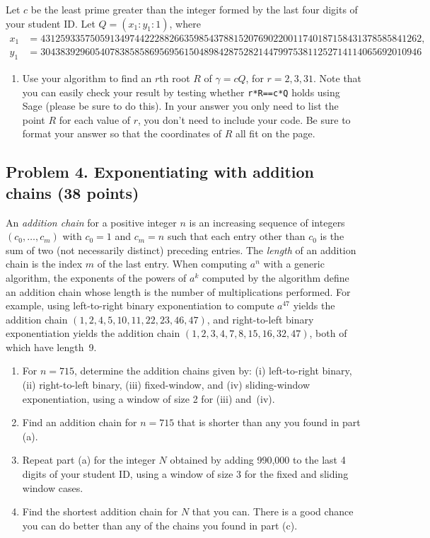 \documentclass[11pt]{article}
\begin{document}
Let $c$ be the least prime greater than the integer formed by the last four digits of your student ID.
Let $Q=(x_1:y_1:1)$, where
\small
\begin{align*}
x_1&=43125933575059134974422288266359854378815207690220011740187158431378585841262,\\
y_1&=30438392960540783858586956956150489842875282144799753811252714114065692010946
\end{align*}
\normalsize
\begin{enumerate}
\item[{\bf (e)}]
Use your algorithm to find an $r$th root $R$ of $\gamma=cQ$, for $r=2,3,31$.
Note that you can easily check your result by testing whether \texttt{r*R==c*Q} holds using Sage (please be sure to do this).
In your answer you only need to list the point $R$ for each value of $r$, you don't need to include your code.
Be sure to format your answer so that the coordinates of $R$ all fit on the page.
\end{enumerate}

\subsection*{Problem 4. Exponentiating with addition chains (38 points)}
An \emph{addition chain} for a positive integer $n$ is an increasing sequence of integers $(c_0,\ldots,c_m)$ with $c_0=1$ and $c_m=n$ such that each entry other than $c_0$ is the sum of two (not necessarily distinct) preceding entries.
The \emph{length} of an addition chain is the index $m$ of the last entry.
When computing $a^n$ with a generic algorithm, the exponents of the powers of $a^k$ computed by the algorithm define an addition chain whose length is the number of multiplications performed.
For example, using left-to-right binary exponentiation to compute $a^{47}$ yields the addition chain $(1,2,4,5,10,11,22,23,46,47)$,
and right-to-left binary exponentiation yields the addition chain $(1,2,3,4,7,8,15,16,32,47)$, both of which have length~9.

\begin{enumerate}[{\bf (a)}]
\item For $n=715$, determine the addition chains given by: (i) left-to-right binary, (ii) right-to-left binary, (iii) fixed-window, and (iv) sliding-window exponentiation, using a window of size 2 for (iii) and~(iv).
\item Find an addition chain for $n=715$ that is shorter than any you found in part (a).
\item Repeat part (a) for the integer $N$ obtained by adding 990,000 to the last 4 digits of your student ID, using a window of size 3 for the fixed and sliding window cases.
\item Find the shortest addition chain for $N$ that you can.
There is a good chance you can do better than any of the chains you found in part (c).
\end{enumerate}
\end{document}
